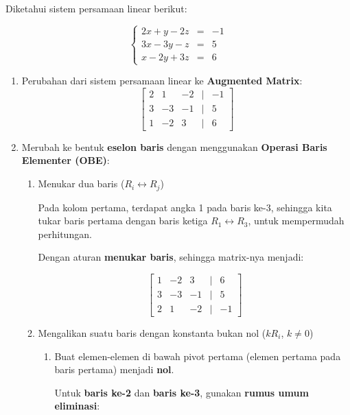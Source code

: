 \documentclass{article}
\begin{document}
\pagestyle{empty}

Diketahui sistem persamaan linear berikut:

\[
\left\{
\begin{array}{rcl}
2x + y - 2z &=& -1 \\
3x - 3y - z &=& 5 \\
x - 2y + 3z &=& 6
\end{array}
\right.
\]

\begin{enumerate}
    \item Perubahan dari sistem persamaan linear ke \textbf{Augmented Matrix}:
    \[
    \begin{bmatrix}
    2 & 1 & -2 & \vert & -1 \\
    3 & -3 & -1 & \vert & 5 \\
    1 & -2 & 3 & \vert & 6
    \end{bmatrix}
    \]
    \item Merubah ke bentuk \textbf{eselon baris} dengan menggunakan \textbf{Operasi Baris Elementer (OBE)}:

    \begin{enumerate}
        \item Menukar dua baris (\(R_i \leftrightarrow R_j\))
    
        Pada kolom pertama, terdapat angka 1 pada baris ke-3, sehingga kita tukar baris pertama dengan baris ketiga \(R_1 \leftrightarrow R_3\), untuk mempermudah perhitungan.

        Dengan aturan \textbf{menukar baris}, sehingga matrix-nya menjadi:

        \[
        \begin{bmatrix}
        1 & -2 & 3 & \vert & 6 \\
        3 & -3 & -1 & \vert & 5 \\
        2 & 1 & -2 & \vert & -1
        \end{bmatrix}
        \]

        \item Mengalikan suatu baris dengan konstanta bukan nol (\(kR_i\), \(k \neq 0\))
        
        \begin{enumerate}
            \item Buat elemen-elemen di bawah pivot pertama (elemen pertama pada baris pertama) menjadi \textbf{nol}.

            \vspace{1em}

            Untuk \textbf{baris ke-2} dan \textbf{baris ke-3}, gunakan \textbf{rumus umum eliminasi}:


\end{enumerate}
\end{enumerate}
\end{enumerate}
\end{document}

